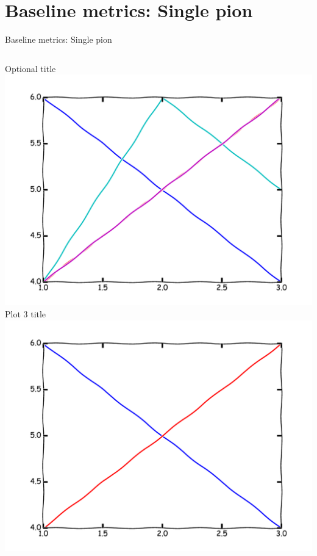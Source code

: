 \section{Baseline metrics: Single pion}
\begin{frame}{Baseline metrics: Single pion}

\begin{columns}
\begin{column}{0.4\textwidth}
\begin{center}
Optional title
\\
\includegraphics[width=\textwidth]{example/plot1.pdf}
\\
Plot 3 title
\\
\includegraphics[width=\textwidth]{example/plot3.pdf}
\\
\end{center}
\end{column}


\end{columns}
\end{frame}
